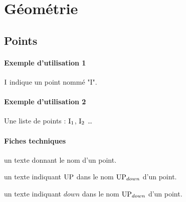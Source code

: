 \documentclass[12pt,a4paper]{article}
\begin{document}
\section{Géométrie}

    \subsection{Points}

            \paragraph{Exemple d'utilisation 1}

\begin{tcblisting}{}
$\pt{I}$ indique un point nommé "I".
\end{tcblisting}


            \paragraph{Exemple d'utilisation 2}

\begin{tcblisting}{}
Une liste de points : $\pt*{I}{1}$, $\pt*{I}{2}$ \dots
\end{tcblisting}


            \paragraph{Fiches techniques}


\IDarg{} un texte donnant le nom d'un point.


\bigskip



 un texte indiquant $\pt{UP}$ dans le nom $\pt*{UP}{down}$ d'un point.

 un texte indiquant $down$ dans le nom $\pt*{UP}{down}$ d'un point.
\end{document}
